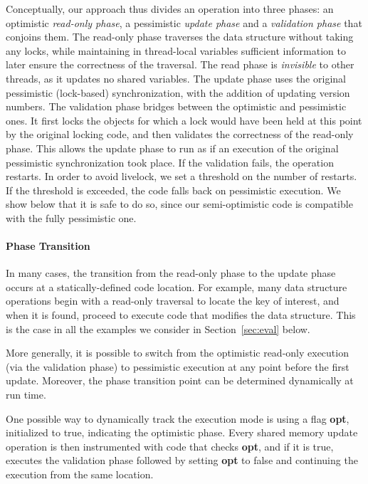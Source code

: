 Conceptually, our approach thus divides an operation into three phases: an optimistic \emph{read-only phase},
a pessimistic \emph{update phase} and a \emph{validation phase} that conjoins them.
The read-only phase traverses the data structure without taking any locks, while maintaining 
in thread-local variables
sufficient information to later ensure the correctness of the traversal.
The read phase is \emph{invisible} to other threads, as it updates no shared variables.
The update phase uses the original pessimistic (lock-based) synchronization, with the addition of updating version numbers.
The validation phase bridges between the optimistic and pessimistic ones.
It first locks the objects for which a lock would have been held at this point by
the original locking code, and then validates the correctness
of the read-only phase. This allows the
update phase to run as if an execution of the original pessimistic synchronization
took place. If the validation fails, the operation
restarts. In order to avoid livelock, we set a threshold on the number of restarts.
If the threshold is exceeded, the code falls back on pessimistic execution.
We show below that
it is safe to do so, since our semi-optimistic code is compatible
with the fully pessimistic one.


\paragraph{Phase Transition}
In many cases, the transition from the read-only phase to the update phase occurs at a statically-defined code location. For example, many data structure operations begin with a read-only traversal to locate the key of interest, and when it is found, proceed to execute code that modifies the data structure. This is the case in all the examples we consider in Section~\ref{sec:eval} below.

More generally, it is possible to switch from the optimistic read-only execution (via the validation phase) to pessimistic execution at any point before the first update. Moreover, the phase transition point can be determined dynamically at run time.

One possible way to dynamically track the execution mode is using a flag \textbf{opt}, initialized to true, indicating the optimistic phase. 
Every shared memory update operation is then instrumented with code that checks \textbf{opt}, and if it is true, executes the validation phase followed by setting \textbf{opt} to false and continuing the execution from the same location. 

